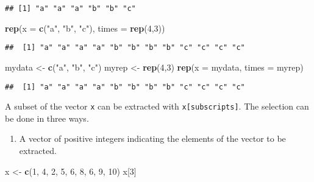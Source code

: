 \documentclass[]{book}
\newenvironment{Shaded}{\begin{snugshade}}{\end{snugshade}}
\newcommand{\KeywordTok}[1]{\textcolor[rgb]{0.13,0.29,0.53}{\textbf{{#1}}}}
\newcommand{\DataTypeTok}[1]{\textcolor[rgb]{0.13,0.29,0.53}{{#1}}}
\newcommand{\DecValTok}[1]{\textcolor[rgb]{0.00,0.00,0.81}{{#1}}}
\newcommand{\StringTok}[1]{\textcolor[rgb]{0.31,0.60,0.02}{{#1}}}
\newcommand{\NormalTok}[1]{{#1}}
\providecommand{\tightlist}{%
  \setlength{\itemsep}{0pt}\setlength{\parskip}{0pt}}
\def\tightlist{}
\begin{document}
\begin{verbatim}
## [1] "a" "a" "a" "b" "b" "c"
\end{verbatim}

\begin{Shaded}
\begin{Highlighting}[]
\KeywordTok{rep}\NormalTok{(}\DataTypeTok{x =} \KeywordTok{c}\NormalTok{(}\StringTok{"a"}\NormalTok{, }\StringTok{"b"}\NormalTok{, }\StringTok{"c"}\NormalTok{), }\DataTypeTok{times =} \KeywordTok{rep}\NormalTok{(}\DecValTok{4}\NormalTok{,}\DecValTok{3}\NormalTok{))}
\end{Highlighting}
\end{Shaded}

\begin{verbatim}
##  [1] "a" "a" "a" "a" "b" "b" "b" "b" "c" "c" "c" "c"
\end{verbatim}

\begin{Shaded}
\begin{Highlighting}[]
\NormalTok{mydata <-}\StringTok{ }\KeywordTok{c}\NormalTok{(}\StringTok{"a"}\NormalTok{, }\StringTok{"b"}\NormalTok{, }\StringTok{"c"}\NormalTok{)}
\NormalTok{myrep <-}\StringTok{ }\KeywordTok{rep}\NormalTok{(}\DecValTok{4}\NormalTok{,}\DecValTok{3}\NormalTok{)}
\KeywordTok{rep}\NormalTok{(}\DataTypeTok{x =} \NormalTok{mydata, }\DataTypeTok{times =} \NormalTok{myrep)}
\end{Highlighting}
\end{Shaded}

\begin{verbatim}
##  [1] "a" "a" "a" "a" "b" "b" "b" "b" "c" "c" "c" "c"
\end{verbatim}

A subset of the vector \texttt{x} can be extracted with
\texttt{x{[}subscripts{]}}. The selection can be done in three ways.

\begin{enumerate}
\def\labelenumi{\arabic{enumi}.}
\tightlist
\item
  A vector of positive integers indicating the elements of the vector to
  be extracted.
\end{enumerate}

\begin{Shaded}
\begin{Highlighting}[]
\NormalTok{x <-}\StringTok{ }\KeywordTok{c}\NormalTok{(}\DecValTok{1}\NormalTok{, }\DecValTok{4}\NormalTok{, }\DecValTok{2}\NormalTok{, }\DecValTok{5}\NormalTok{, }\DecValTok{6}\NormalTok{, }\DecValTok{8}\NormalTok{, }\DecValTok{6}\NormalTok{, }\DecValTok{9}\NormalTok{, }\DecValTok{10}\NormalTok{)}
\NormalTok{x[}\DecValTok{3}\NormalTok{]}
\end{Highlighting}
\end{Shaded}
\end{document}
